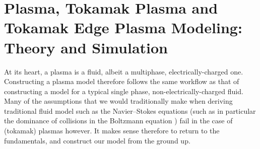 \section{Plasma, Tokamak Plasma and Tokamak Edge Plasma Modeling: Theory and Simulation}

    At its heart, a plasma is a fluid, albeit a multiphase, electrically-charged one. Constructing a plasma model therefore follows the same workflow as that of constructing a model for a typical single phase, non-electrically-charged fluid. Many of the assumptions that we would traditionally make when deriving traditional fluid model such as the Navier–Stokes equations (such as in particular the dominance of collisions in the Boltzmann equation \BA{[Ref]}) fail in the case of (tokamak) plasmas however. It makes sense therefore to return to the fundamentals, and construct our model from the ground up.


    
    
    
    

